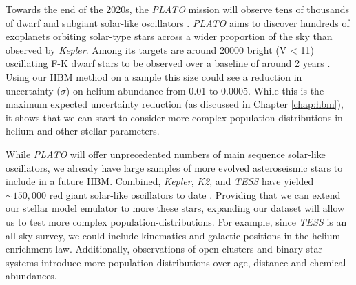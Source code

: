 
Towards the end of the 2020s, the \emph{PLATO} mission will observe tens of thousands of dwarf and subgiant solar-like oscillators \citep{Rauer.Catala.ea2014}. \emph{PLATO} aims to discover hundreds of exoplanets orbiting solar-type stars across a wider proportion of the sky than observed by \emph{Kepler}. Among its targets are around \num{20000} bright (V < 11) oscillating F-K dwarf stars to be observed over a baseline of around 2 years \citep{Goupil2017}. Using our HBM method on a sample this size could see a reduction in uncertainty (\(\sigma\)) on helium abundance from 0.01 to 0.0005. While this is the maximum expected uncertainty reduction (as discussed in Chapter \ref{chap:hbm}), it shows that we can start to consider more complex population distributions in helium and other stellar parameters.

While \emph{PLATO} will offer unprecedented numbers of main sequence solar-like oscillators, we already have large samples of more evolved asteroseismic stars to include in a future HBM. Combined, \emph{Kepler}, \emph{K2}, and \emph{TESS} have yielded \(\sim 150,000\) red giant solar-like oscillators to date \citep{Hon.Huber.ea2021,Yu.Huber.ea2018}. Providing that we can extend our stellar model emulator to more these stars, expanding our dataset will allow us to test more complex population-distributions. For example, since \emph{TESS} is an all-sky survey, we could include kinematics and galactic positions in the helium enrichment law. Additionally, observations of open clusters and binary star systems introduce more population distributions over age, distance and chemical abundances.


